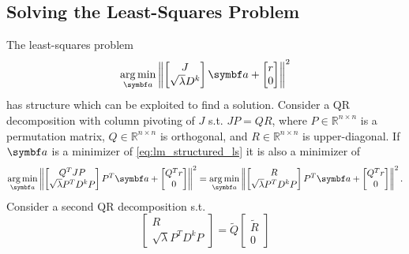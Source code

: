 \subsection{Solving the Least-Squares Problem}
\label{ssec:lm_lsq}

The least-squares problem
\begin{equation}
  \label{eq:lm_structured_ls}
  \argmin_{\a} \left\| \begin{bmatrix} J \\ \sqrt{\lambda} D^k \end{bmatrix} \a + \begin{bmatrix} r \\ 0 \end{bmatrix} \right\|^2
\end{equation}
has structure which can be exploited to find a solution. Consider a QR decomposition with column pivoting of $J$ s.t. $J P = Q R$, where $P \in \mathbb{R}^{n \times n}$ is a permutation matrix, $Q \in \mathbb{R}^{n \times n}$ is orthogonal, and $R \in \mathbb{R}^{n \times n}$ is upper-diagonal. If $\a$ is a minimizer of \eqref{eq:lm_structured_ls} it is also a minimizer of
\begin{equation}
  \label{eq:lm_structured_ls}
  \argmin_{\a} \left\| \begin{bmatrix} Q^{T} J P \\ \sqrt{\lambda} P^{T} D^k P \end{bmatrix} P^{T} \a + \begin{bmatrix} Q^{T} r \\ 0 \end{bmatrix} \right\|^2 =     \argmin_{\a} \left\| \begin{bmatrix} R \\ \sqrt{\lambda} P^{T} D^k P \end{bmatrix} P^{T} \a + \begin{bmatrix} Q^{T} r \\ 0 \end{bmatrix} \right\|^2.
\end{equation}
Consider a second QR decomposition s.t.
\begin{equation}
  \label{eq:lm_qr}
  \begin{bmatrix}
    R \\ \sqrt{\lambda} P^{T} D^{k} P
  \end{bmatrix} = \tilde Q \begin{bmatrix} \tilde R \\ 0 \end{bmatrix}
\end{equation}
